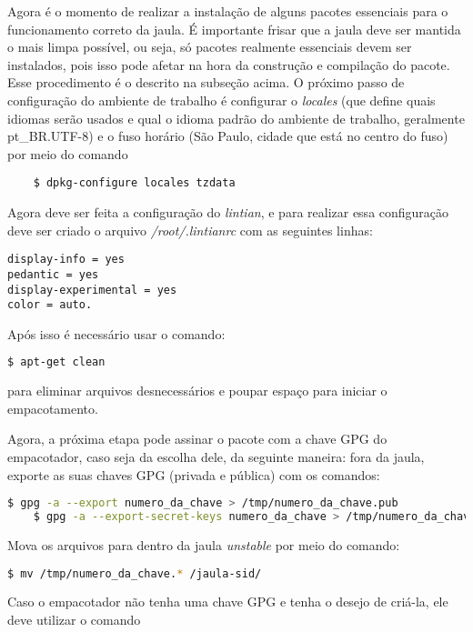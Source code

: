 Agora é o momento de realizar a instalação de alguns pacotes essenciais para o funcionamento correto da jaula. É importante frisar que a jaula deve ser mantida o mais limpa possível, ou seja, só pacotes realmente essenciais devem ser instalados, pois isso pode afetar na hora da construção e compilação do pacote. Esse procedimento é o descrito na subseção acima. O próximo passo de configuração do ambiente de trabalho é configurar o \textit{locales} (que define quais idiomas serão usados e qual o idioma padrão do ambiente de trabalho, geralmente pt\_BR.UTF-8) e o fuso horário (São Paulo, cidade que está no centro do fuso) por meio do comando
\begin{verbatim}
	$ dpkg-configure locales tzdata
\end{verbatim}
Agora deve ser feita a configuração do \textit{lintian}, e para realizar essa configuração deve ser criado o arquivo \textit{/root/.lintianrc} com as seguintes linhas: 

\begin{verbatim}
display-info = yes 
pedantic = yes 
display-experimental = yes 
color = auto.
\end{verbatim}

Após isso é necessário usar o comando:

\begin{lstlisting}[language=bash]
	$ apt-get clean
\end{lstlisting}

para eliminar arquivos desnecessários e poupar espaço para iniciar o empacotamento.

Agora, a próxima etapa pode assinar o pacote com a chave GPG do empacotador, caso seja da escolha dele, da seguinte maneira: fora da jaula, exporte as suas chaves GPG (privada e pública) com os comandos:

\begin{lstlisting}[language=bash]
	$ gpg -a --export numero_da_chave > /tmp/numero_da_chave.pub 
	$ gpg -a --export-secret-keys numero_da_chave > /tmp/numero_da_chave.key
\end{lstlisting} 

Mova os arquivos para dentro da jaula \textit{unstable} por meio do comando:

\begin{lstlisting}[language=bash]
	$ mv /tmp/numero_da_chave.* /jaula-sid/
\end{lstlisting}

Caso o empacotador não tenha uma chave GPG e tenha o desejo de criá-la, ele deve utilizar o comando

